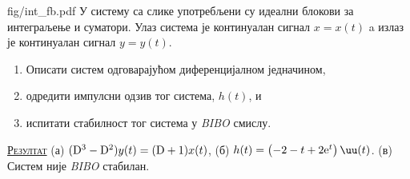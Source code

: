 \noindent
\begin{slikaDesno}{fig/int_fb.pdf}
\PID У систему са слике употребљени су идеални
блокови за интеграљење и суматори. Улаз система  
је континуалан сигнал $x = x(t)$ a излаз је 
континуалан сигнал $y = y(t)$. 
\end{slikaDesno}
\begin{enumerate}[label=(\alph*)]
    \item Описати 
    систем одговарајућом диференцијалном једначином,
    \item одредити импулсни одзив тог система,  $h(t)$, и
    \item испитати стабилност тог система
    у \textit{BIBO} смислу.
\end{enumerate}

\vspace*{2mm}

\textsc{\underline{Резултат}} 
(а) $({\rm D}^3 - {\rm D}^2) y(t) = 
({\rm D} + 1) x(t)$, 
\quad
(б) $h(t) = 
\bigl(
-2-t+2{\rm e}^t
\bigr)
\,\uu(t)$.
\quad
(в) Систем није 
\textit{BIBO}
стабилан.
